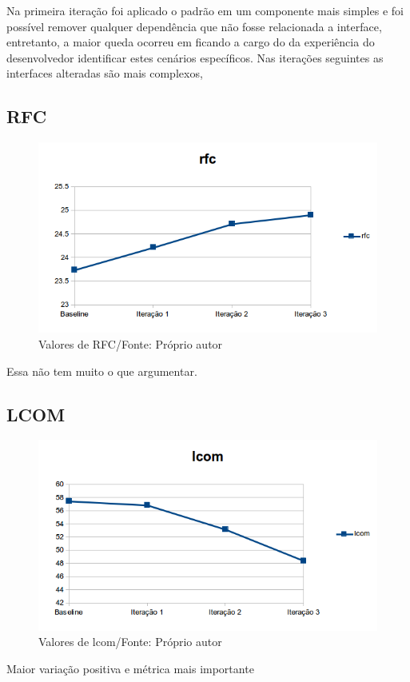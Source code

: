 Na primeira iteração foi aplicado o padrão em um componente mais simples e foi
possível remover qualquer dependência que não fosse relacionada a interface,
entretanto, a maior queda ocorreu em  ficando a cargo do da experiência do
desenvolvedor identificar estes cenários específicos. Nas iterações seguintes as
interfaces alteradas são mais complexos,

\subsection{RFC}

\begin{figure}[h]
	\centering
	\includegraphics{img/rfc.png}
	\caption{Valores de RFC/Fonte: Próprio autor}
	\label{fig:rfc}
\end{figure}

Essa não tem muito o que argumentar. 

\subsection{LCOM}

\begin{figure}[h]
	\centering
	\includegraphics{img/lcom.png}
	\caption{Valores de lcom/Fonte: Próprio autor}
	\label{fig:lcom}
\end{figure}

Maior variação positiva e métrica mais importante


